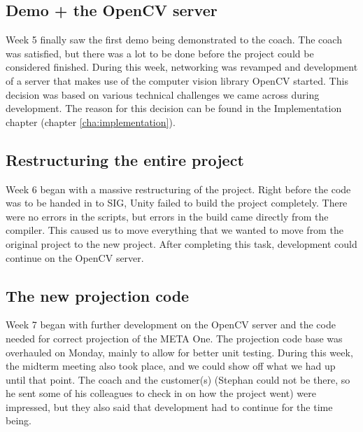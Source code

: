       \subsection{Demo + the OpenCV server} \label{ssec:firstdemo}
      Week 5 finally saw the first demo being demonstrated to the coach. The
      coach was satisfied, but there was a lot to be done before the project
      could be considered finished. During this week, networking was revamped
      and development of a server that makes use of the computer vision library
      OpenCV started. This decision was based on various technical challenges we 
      came across during development. The reason for this decision can be found 
      in the Implementation chapter (chapter \ref{cha:implementation}).
      
      \subsection{Restructuring the entire project}
      Week 6 began with a massive restructuring of the project. Right before
      the code was to be handed in to SIG, Unity failed to build the project
      completely. There were no errors in the scripts, but errors in the build
      came directly from the compiler. This caused us to move everything that
      we wanted to move from the original project to the new project. After
      completing this task, development could continue on the OpenCV server.
      
      \subsection{The new projection code}
      Week 7 began with further development on the OpenCV server and the code
      needed for correct projection of the META One. The projection code base
      was overhauled on Monday, mainly to allow for better unit testing. During
      this week, the midterm meeting also took place, and we could show off
      what we had up until that point. The coach and the customer(s) (Stephan
      could not be there, so he sent some of his colleagues to check in on
      how the project went) were impressed, but they also said that development
      had to continue for the time being.
      
